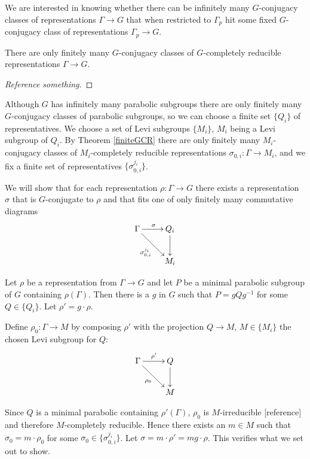 We are interested in knowing whether there can be infinitely many $G$-conjugacy classes of representations $\Gamma\rightarrow G$ that when restricted to $\Gamma_p$ hit some fixed $G$-conjugacy class of representations $\Gamma_p\rightarrow G$. 

\begin{theorem} \label{finiteGCR} There are only finitely many $G$-conjugacy classes of $G$-completely reducible representations $\Gamma\rightarrow G$.
\end{theorem}
\begin{proof}[Reference something]
\end{proof}

Although $G$ has infinitely many parabolic subgroups there are only finitely many $G$-conjugacy classes of parabolic subgroups, so we can choose a finite set $\{Q_i\}$ of representatives. We choose a set of Levi subgroups $\{M_i\}$, $M_i$ being a Levi subgroup of $Q_i$. By Theorem \ref{finiteGCR} there are only finitely many $M_i$-conjugacy classes of $M_i$-completely reducible representations $\sigma_{0, i}:\Gamma\rightarrow M_i$, and we fix a finite set of representatives $\{\sigma^{j_i}_{0,i}\}$.

We will show that for each representation $\rho:\Gamma\rightarrow G$ there exists a representation $\sigma$ that is $G$-conjugate to $\rho$ and that fits one of only finitely many commutative diagrams
\begin{displaymath}
	\xymatrix{
	\Gamma \ar[r]^{\sigma} \ar[rd]_{\sigma^{j_i}_{0,i}} & Q_i \ar[d]\\
	& M_i}
\end{displaymath}

Let $\rho$ be a representation from $\Gamma\rightarrow G$ and let $P$ be a minimal parabolic subgroup of $G$ containing $\rho(\Gamma)$. Then there is a $g$ in $G$ such that $P = gQg^{-1}$ for some $Q\in\{Q_i\}$. Let $\rho' = g\cdot \rho$. 

Define $\rho_0:\Gamma\rightarrow M$ by composing $\rho'$ with the projection $Q\rightarrow M$, $M\in\{M_i\}$ the chosen Levi subgroup for $Q$:
\begin{displaymath}
	\xymatrix{
	\Gamma \ar[r]^{\rho'} \ar[rd]_{\rho_0} & Q \ar[d]\\
	& M}
\end{displaymath}

Since $Q$ is a minimal parabolic containing $\rho'(\Gamma)$, $\rho_0$ is $M$-irreducible [reference] and therefore $M$-completely reducible. Hence there exists an $m\in M$ such that $\sigma_0 = m\cdot \rho_0$ for some $\sigma_0\in\{\sigma^{j_i}_{0,i}\}$. Let $\sigma = m\cdot \rho' = mg\cdot \rho$. This verifies what we set out to show.

